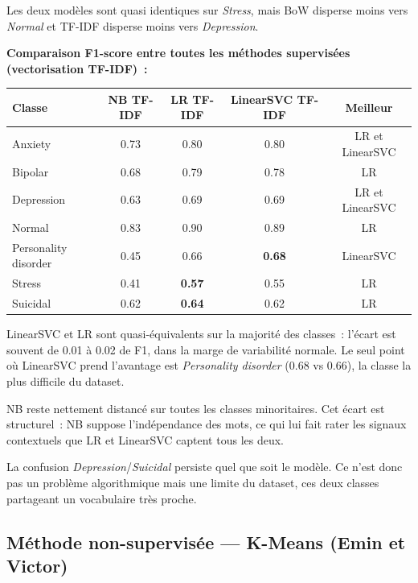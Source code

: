 \documentclass[12pt,a4paper]{article}
\begin{document}
Les deux modèles sont quasi identiques sur \textit{Stress}, mais BoW disperse moins vers \textit{Normal} et TF-IDF disperse moins vers \textit{Depression}.

\textbf{Comparaison F1-score entre toutes les méthodes supervisées (vectorisation TF-IDF)~:}

\begin{center}
\renewcommand{\arraystretch}{1.2}
\begin{tabular}{lcccc}
\toprule
\textbf{Classe} & \textbf{NB TF-IDF} & \textbf{LR TF-IDF} & \textbf{LinearSVC TF-IDF} & \textbf{Meilleur} \\
\midrule
Anxiety              & 0.73 & 0.80 & 0.80 & LR et LinearSVC \\
Bipolar              & 0.68 & 0.79 & 0.78 & LR \\
Depression           & 0.63 & 0.69 & 0.69 & LR et LinearSVC \\
Normal               & 0.83 & 0.90 & 0.89 & LR \\
Personality disorder & 0.45 & 0.66 & \textbf{0.68} & LinearSVC \\
Stress               & 0.41 & \textbf{0.57} & 0.55 & LR \\
Suicidal             & 0.62 & \textbf{0.64} & 0.62 & LR \\
\bottomrule
\end{tabular}
\end{center}

LinearSVC et LR sont quasi-équivalents sur la majorité des classes~: l'écart est souvent de 0.01 à 0.02 de F1, dans la marge de variabilité normale. Le seul point où LinearSVC prend l'avantage est \textit{Personality disorder} (0.68 vs 0.66), la classe la plus difficile du dataset.

NB reste nettement distancé sur toutes les classes minoritaires. Cet écart est structurel~: NB suppose l'indépendance des mots, ce qui lui fait rater les signaux contextuels que LR et LinearSVC captent tous les deux.

La confusion \textit{Depression}/\textit{Suicidal} persiste quel que soit le modèle. Ce n'est donc pas un problème algorithmique mais une limite du dataset, ces deux classes partageant un vocabulaire très proche.

\subsection{Méthode non-supervisée --- K-Means (Emin et Victor)}
\end{document}
